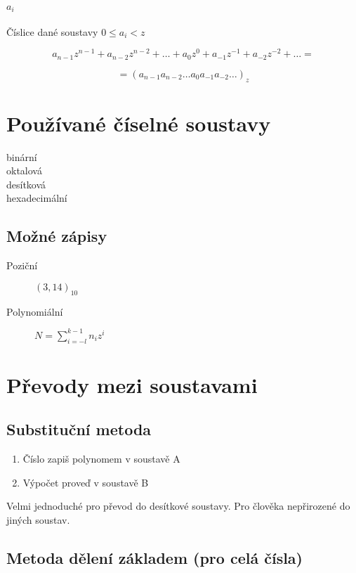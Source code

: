 \documentclass[a4wide]{report}
\begin{document}
\paragraph{$a_i$} Číslice dané soustavy $ 0 \le a_i < z$

$$a_{n-1}z^{n-1} + a_{n-2} z^{n-2} + \dots + a_0 z^0 + a_{-1} z^{-1} + a_{-2} z^{-2} + \dots =$$

$$ = (a_{n-1} a_{n-2}  \dots a_0 a_{-1} a_{-2} \dots)_z$$

\section{Používané číselné soustavy}

\begin{description}
	\item[binární]
	\item[oktalová]
	\item[desítková]
	\item[hexadecimální]
\end{description}

\subsection{Možné zápisy}
\begin{description}
	\item[Poziční] $(3,14)_{10}$
	\item[Polynomiální] $N =  \sum_{i=-l}^{k-1} n_i z^i$
\end{description}

\section{Převody mezi soustavami}

\subsection{Substituční metoda}

\begin{enumerate}
	\item Číslo zapiš polynomem  v soustavě A
	\item Výpočet proveď v soustavě B
\end{enumerate}


Velmi jednoduché pro převod do desítkové soustavy. Pro člověka nepřirozené do jiných soustav.

\subsection{Metoda dělení základem (pro celá čísla)}
\end{document}
